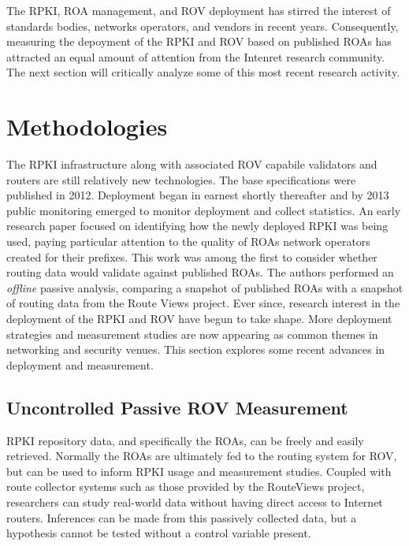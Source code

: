 \documentclass[sigconf]{acmart}
\begin{document}
The RPKI, ROA management, and ROV deployment has stirred the interest of
standards bodies, networks operators, and vendors in recent years.
Consequently, measuring the depoyment of the RPKI and ROV based on
published ROAs has attracted an equal amount of attention from the
Intenret research community.  The next section will critically analyze
some of this most recent research activity.

\section{Methodologies}\label{sec:Methodologies}

The RPKI infrastructure along with associated ROV capabile validators
and routers are still relatively new technologies.  The base
specifications were published in 2012.  Deployment began in earnest
shortly thereafter and by 2013 public monitoring emerged to monitor
deployment and collect statistics.\cite{nist_rpki_2019}  An early
research paper focused on identifying how the newly deployed RPKI was
being used, paying particular attention to the quality of ROAs network
operators created for their prefixes.\cite{iamartino_measuring_2015}
This work was among the first to consider whether routing data would
validate against published ROAs.  The authors performed an
\emph{offline} passive analysis, comparing a snapshot of published ROAs
with a snapshot of routing data from the Route Views
project.\cite{oregon_routeviews_2019}  Ever since, research interest in
the deployment of the RPKI and ROV have begun to take shape.  More
deployment strategies and measurement studies are now appearing as
common themes in networking and security venues.  This section explores
some recent advances in deployment and measurement.

\subsection{Uncontrolled Passive ROV Measurement}

RPKI repository data, and specifically the ROAs, can be freely and
easily retrieved.  Normally the ROAs are ultimately fed to the routing
system for ROV, but can be used to inform RPKI usage and measurement
studies.  Coupled with route collector systems such as those provided by
the RouteViews project, researchers can study real-world data without
having direct access to Internet routers.  Inferences can be made from
this passively collected data, but a hypothesis cannot be tested without
a control variable present.
\end{document}
